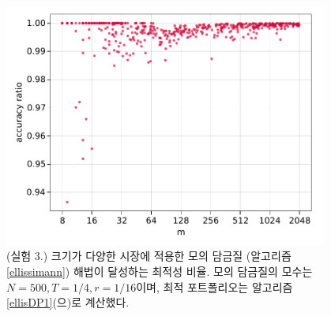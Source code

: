 \documentclass[11pt]{article} %
\newif\ifen
\theoremstyle{definition}
\theoremstyle{definition}
\begin{document}
\begin{figure}[h!] 
\centering
\includegraphics[width=0.95\textwidth]{./plots/accuracy_simulatedannealing.pdf}
  \caption{\label{experiment3results}
 \ifen (Experiment 3.) Optimality ratio achieved by simulated annealing (Algorithm \ref{ellissimann}) in markets of varying size, with parameters $N = 500$, $T = 1/4$, and $r = 1/16$. Optimal portfolios were computed using Algorithm \ref{ellisDP1}. 
 \else  (실험 3.) 크기가 다양한 시장에 적용한 모의 담금질 (알고리즘 \ref{ellissimann}) 해법이 달성하는 최적성 비율. 모의 담금질의 모수는 $N = 500, T = 1/4, r = 1/16$이며, 최적 포트폴리오는 알고리즘 \ref{ellisDP1}(으)로 계산했다. \fi}
\end{figure}
\end{document}
